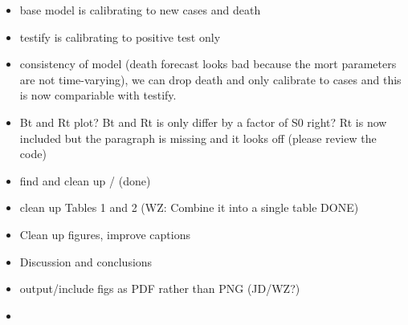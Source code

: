 \documentclass[12pt]{article}\usepackage[]{graphicx}\usepackage[]{color}
\begin{document}
\begin{itemize}
\item base model is calibrating to new cases and death
\item testify is calibrating to positive test only
\item consistency of model (death forecast looks bad because the mort parameters are not time-varying), we can drop death and only calibrate to cases and this is now compariable with testify.
\item Bt and Rt plot? Bt and Rt is only differ by a factor of S0 right? Rt is now included but the paragraph is missing and it looks off (please review the code) 
\item find and clean up / (done)
\item clean up Tables 1 and 2 (WZ: Combine it into a single table DONE)
\item Clean up figures, improve captions  
\item Discussion and conclusions
\item output/include figs as PDF rather than PNG (JD/WZ?) 
\item {}
\end{itemize}

\clearpage



\end{document}
